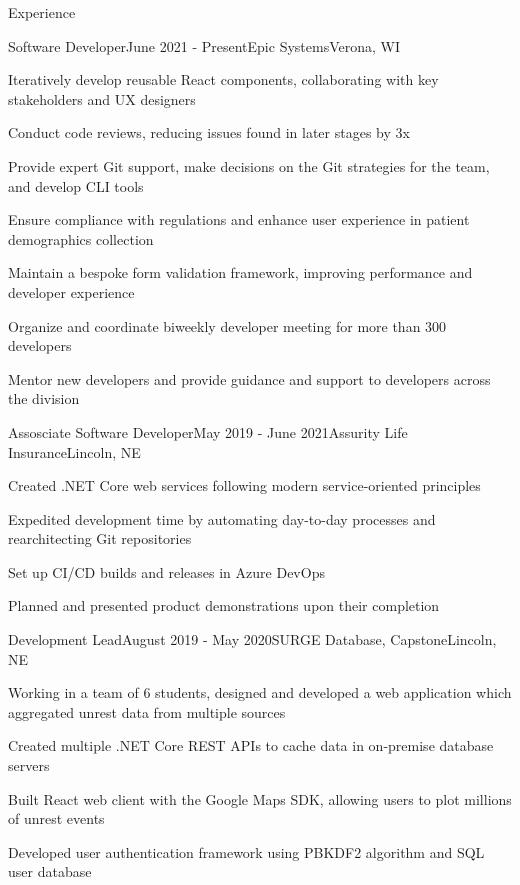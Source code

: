 \documentclass[
	10pt, %
]{article} %
\begin{document}
\begin{rSection}{Experience}

	\begin{rSubsection}{Software Developer}{June 2021 - Present}{Epic Systems}{Verona, WI}
		\item Iteratively develop reusable React components, collaborating with key stakeholders and UX designers
		\item Conduct code reviews, reducing issues found in later stages by 3x
		\item Provide expert Git support, make decisions on the Git strategies for the team, and develop CLI tools
		\item Ensure compliance with regulations and enhance user experience in patient demographics collection
		\item Maintain a bespoke form validation framework, improving performance and developer experience
		\item Organize and coordinate biweekly developer meeting for more than 300 developers
		\item Mentor new developers and provide guidance and support to developers across the division
	\end{rSubsection}

	\begin{rSubsection}{Assosciate Software Developer}{May 2019 - June 2021}{Assurity Life Insurance}{Lincoln, NE}
		\item Created .NET Core web services following modern service-oriented principles
		\item Expedited development time by automating day-to-day processes and rearchitecting Git repositories
		\item Set up CI/CD builds and releases in Azure DevOps
		\item Planned and presented product demonstrations upon their completion
	\end{rSubsection}

	\begin{rSubsection}{Development Lead}{August 2019 - May 2020}{SURGE Database, Capstone}{Lincoln, NE}
		\item Working in a team of 6 students, designed and developed a web application which aggregated unrest data from multiple sources
		\item Created multiple .NET Core REST APIs to cache data in on-premise database servers
		\item Built React web client with the Google Maps SDK, allowing users to plot millions of unrest events
		\item Developed user authentication framework using PBKDF2 algorithm and SQL user database
	\end{rSubsection}


\end{rSection}
\end{document}
